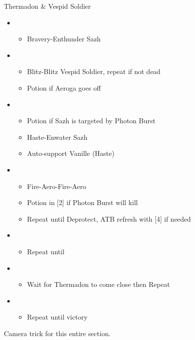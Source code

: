 	\begin{battle}[1:05]{Thermadon \& Vespid Soldier}
		\begin{itemize}
			\item \first
			      \begin{itemize}
				      \item Bravery-Enthunder Sazh
			      \end{itemize}
			\item \sixth
			      \begin{itemize}
				      \item Blitz-Blitz Vespid Soldier, repeat if not dead
				      \item Potion if Aeroga goes off
			      \end{itemize}
			\item \first
			      \begin{itemize}
				      \item Potion if Sazh is targeted by Photon Burst
				      \item Haste-Enwater Sazh
				      \item Auto-support Vanille (Haste)
			      \end{itemize}
			\item \fifth
			      \begin{itemize}
				      \item Fire-Aero-Fire-Aero
				      \item Potion in [2] if Photon Burst will kill
				      \item Repeat until Deprotect, ATB refresh with [4] if needed
			      \end{itemize}
			\item \fourth
			      \begin{itemize}
				      \item Repeat until \stagger
			      \end{itemize}
			\item \second
			      \begin{itemize}
				      \item Wait for Thermadon to come close then Repeat
			      \end{itemize}
			\item \third
			      \begin{itemize}
				      \item Repeat until victory
			      \end{itemize}
		\end{itemize}
	\end{battle}
	Camera trick for this entire section.

